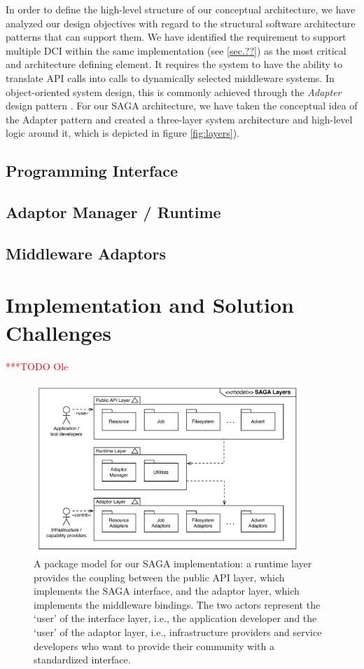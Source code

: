 \documentclass[a4paper,12pt]{article}
\newcommand{\todo}[1]{     {\textcolor{red}  { ***TODO      #1 }}}
\newcommand{\todo}[1]{}
\begin{document}
In order to define the high-level structure of our conceptual architecture, we
have analyzed our design objectives with regard to the structural software
architecture patterns that can support them. We have identified the requirement
to support multiple DCI within the same implementation (see \ref{sec.??}) as
the most critical and architecture defining element. It requires the system to
have the ability to translate API calls into calls to dynamically selected
middleware systems. In object-oriented system design, this is commonly achieved
through the \textit{Adapter} design pattern \cite{XXX}. For our SAGA
architecture, we have taken the conceptual idea of the Adapter pattern and
created a three-layer system architecture and high-level logic around it, which
is depicted in figure \ref{fig:layers}).


\subsection{Programming Interface}

\subsection{Adaptor Manager / Runtime}

\subsection{Middleware Adaptors}


% 
\section{Implementation and Solution Challenges}\todo{Ole}

\begin{figure}[h!] \centering
\includegraphics[width=0.9\textwidth]{figures/package_model.pdf} 
\caption{A package model for our SAGA implementation: a runtime layer provides the
coupling between the public API layer, which implements the SAGA interface, and
the adaptor layer, which implements the middleware bindings. The two actors represent 
the `user' of the interface layer, i.e., the application developer and the `user'
of the adaptor layer, i.e., infrastructure providers and service developers who
want to provide their community with a standardized interface.} 
\end{figure}
\end{document}
